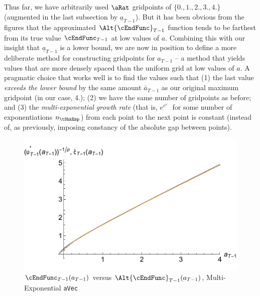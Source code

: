 \documentclass[titlepage]{\econtex}
\begin{document}
Thus far, we have arbitrarily used $\aRat$ gridpoints of
$\{0.,1.,2.,3.,4.\}$ (augmented in the last subsection by
$\underline{a}_{T-1}$).  But it has been obvious from the figures that
the approximated $\Alt{\cEndFunc}_{T-1}$ function tends to be farthest from its true
value $\cEndFunc_{T-1}$ at low values of ${a}$.  Combining this with our insight that
$\underline{a}_{T-1}$ is a lower bound, we are now in position to
define a more deliberate method for constructing gridpoints for
${a}_{T-1}$ -- a method that yields values that are more densely
spaced than the uniform grid at low values of ${a}$.  A pragmatic
choice that works well is to find the values such that (1) the last
value \textit{exceeds the lower bound} by the same amount $\bar{a}_{T-1}$
as our original maximum gridpoint (in our case, 4.); (2) we have the
same number of gridpoints as before; and (3) the \textit{multi-exponential growth rate} (that is, $e^{e^{e^{...}}}$ for some
number of exponentiations $n_{\tShkEmp}$) from each point to the next point is
constant (instead of, as previously, imposing constancy of the
absolute gap between points).

\hypertarget{GothVInvVSGothCEEE}{}
\begin{figure}
  \includegraphics{./Figures/GothVInvVSGothCEEE}
  \caption{$\cEndFunc_{T-1}({a}_{T-1})$ versus
    $\Alt{\cEndFunc}_{T-1}({a}_{T-1})$, Multi-Exponential \texttt{aVec}}
  \label{fig:GothVInvVSGothCEE}
\end{figure}
\end{document}
